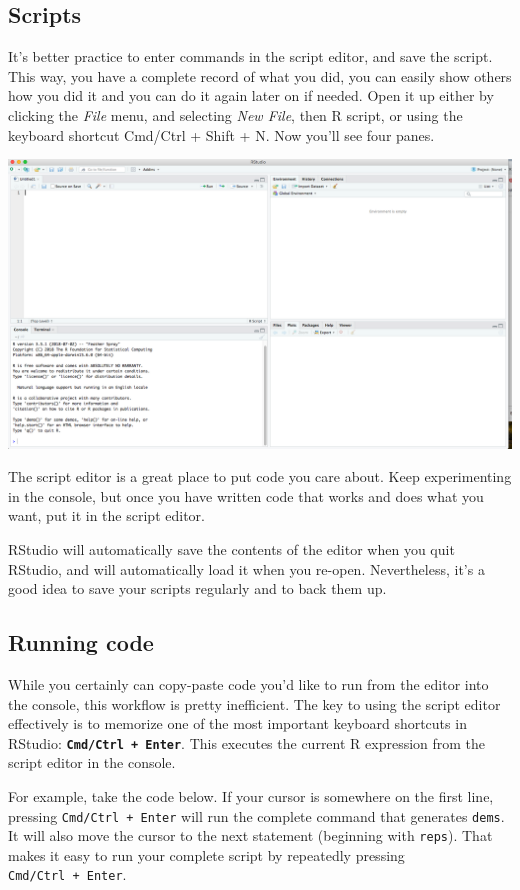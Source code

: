 \documentclass[]{book}
\begin{document}
\subsection{Scripts}\label{scripts}

It's better practice to enter commands in the script editor, and save
the script. This way, you have a complete record of what you did, you
can easily show others how you did it and you can do it again later on
if needed. Open it up either by clicking the \emph{File} menu, and
selecting \emph{New File}, then R script, or using the keyboard shortcut
Cmd/Ctrl + Shift + N. Now you'll see four panes.

\begin{center}\includegraphics[width=0.7\linewidth]{./img/4-panes} \end{center}

The script editor is a great place to put code you care about. Keep
experimenting in the console, but once you have written code that works
and does what you want, put it in the script editor.

RStudio will automatically save the contents of the editor when you quit
RStudio, and will automatically load it when you re-open. Nevertheless,
it's a good idea to save your scripts regularly and to back them up.

\subsection{Running code}\label{running-code}

While you certainly can copy-paste code you'd like to run from the
editor into the console, this workflow is pretty inefficient. The key to
using the script editor effectively is to memorize one of the most
important keyboard shortcuts in RStudio:
\textbf{\texttt{Cmd/Ctrl\ +\ Enter}}. This executes the current R
expression from the script editor in the console.

For example, take the code below. If your cursor is somewhere on the
first line, pressing \texttt{Cmd/Ctrl\ +\ Enter} will run the complete
command that generates \texttt{dems}. It will also move the cursor to
the next statement (beginning with \texttt{reps}). That makes it easy to
run your complete script by repeatedly pressing
\texttt{Cmd/Ctrl\ +\ Enter}.
\end{document}
